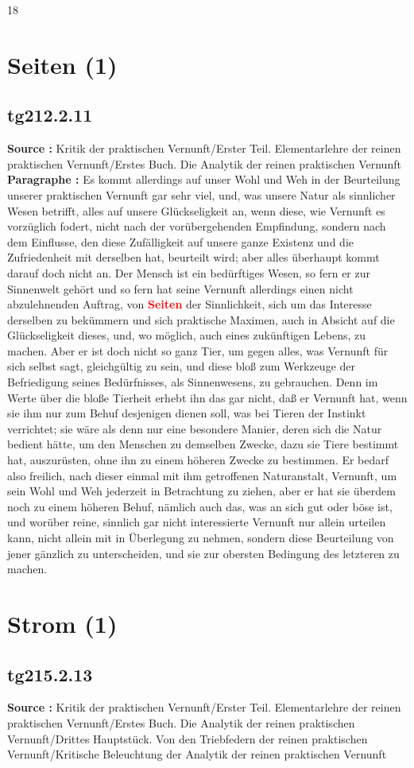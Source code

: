 \documentclass[a4paper,12pt,twoside]{book}
\newcommand{\match}[1]{\textcolor{red}{\textbf{#1}}}
\newcommand{\unnumberedsection}[1]{
	\section*{#1}
	\addcontentsline{toc}{section}{#1}
	\markright{#1}
}
\begin{document}
	
	18
	
	
	
	\unnumberedsection{Seiten (1)} 
	\subsection*{tg212.2.11} 
	\textbf{Source : }Kritik der praktischen Vernunft/Erster Teil. Elementarlehre der reinen praktischen Vernunft/Erstes Buch. Die Analytik der reinen praktischen Vernunft\\  
	
	\noindent\textbf{Paragraphe : }Es kommt allerdings auf unser Wohl und Weh in der Beurteilung unserer praktischen Vernunft gar sehr viel, und, was unsere Natur als sinnlicher Wesen betrifft, alles auf unsere Glückseligkeit an, wenn diese, wie Vernunft es  vorzüglich fodert, nicht nach der vorübergehenden Empfindung, sondern nach dem Einflusse, den diese Zufälligkeit auf unsere ganze Existenz und die Zufriedenheit mit derselben hat, beurteilt wird; aber alles überhaupt kommt darauf doch nicht an. Der Mensch ist ein bedürftiges Wesen, so fern er zur Sinnenwelt gehört und so fern hat seine Vernunft allerdings einen nicht abzulehnenden Auftrag, von \match{Seiten} der Sinnlichkeit, sich um das Interesse derselben zu bekümmern und sich praktische Maximen, auch in Absicht auf die Glückseligkeit dieses, und, wo möglich, auch eines zukünftigen Lebens, zu machen. Aber er ist doch nicht so ganz Tier, um gegen alles, was Vernunft für sich selbst sagt, gleichgültig zu sein, und diese bloß zum Werkzeuge der Befriedigung seines Bedürfnisses, als Sinnenwesens, zu gebrauchen. Denn im Werte über die bloße Tierheit erhebt ihn das gar nicht, daß er Vernunft hat, wenn sie ihm nur zum Behuf desjenigen dienen soll, was bei Tieren der Instinkt verrichtet; sie wäre als denn nur eine besondere Manier, deren sich die Natur bedient hätte, um den Menschen zu demselben Zwecke, dazu sie Tiere bestimmt hat, auszurüsten, ohne ihn zu einem höheren Zwecke zu bestimmen. Er bedarf also freilich, nach dieser einmal mit ihm getroffenen Naturanstalt, Vernunft, um sein Wohl und Weh jederzeit in Betrachtung zu ziehen, aber er hat sie überdem noch zu einem höheren Behuf, nämlich auch das, was an sich gut oder böse ist, und worüber reine, sinnlich gar nicht interessierte Vernunft nur allein urteilen kann, nicht allein mit in Überlegung zu nehmen, sondern diese Beurteilung von jener gänzlich zu unterscheiden, und sie zur obersten Bedingung des letzteren zu machen. 
	
	\unnumberedsection{Strom (1)} 
	\subsection*{tg215.2.13} 
	\textbf{Source : }Kritik der praktischen Vernunft/Erster Teil. Elementarlehre der reinen praktischen Vernunft/Erstes Buch. Die Analytik der reinen praktischen Vernunft/Drittes Hauptstück. Von den Triebfedern der reinen praktischen Vernunft/Kritische Beleuchtung der Analytik der reinen praktischen Vernunft\\  
	
\end{document}
